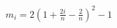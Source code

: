 \documentclass[preview]{standalone}
\begin{document}
\begin{align*}
m_i = 2\left(1 + \frac{2i}{n} - \frac{2}{n}\right)^2 - 1
\end{align*}
\end{document}
